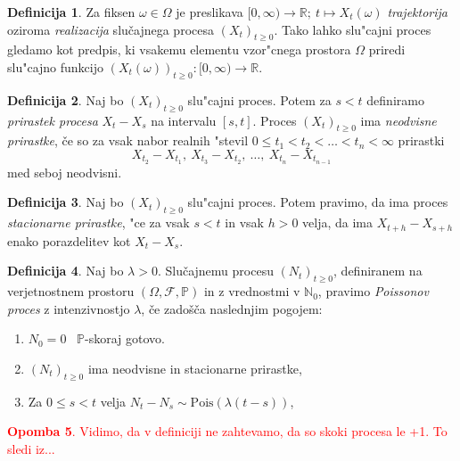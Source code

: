 \documentclass[12pt, a4paper, reqno]{amsart}
\theoremstyle{definition}
\newtheorem{definicija}{Definicija}[section]
\newtheorem{opomba}[definicija]{Opomba}
\theoremstyle{plain}
\newcommand{\N}{\mathbb{N}}
\newcommand{\Prob}{\mathbb{P}}
\newcommand{\1}{\mathds{1}}
\newcommand{\Pois}[1]{\text{Pois}(#1)}
\begin{document}
    \begin{definicija}
        Za fiksen $\omega \in \Omega$ je preslikava 
        $[0, \infty) \rightarrow \mathbb{R}; \ t \mapsto X_t(\omega)$ 
        \textit{trajektorija} oziroma \textit{realizacija} slučajnega procesa $(X_t)_{t\geq0}$.
        Tako lahko slu"cajni proces gledamo kot predpis, ki vsakemu elementu vzor"cnega prostora 
        $\Omega$ priredi slu"cajno funkcijo
        $(X_t(\omega))_{t\geq0}: [0, \infty) \rightarrow \mathbb{R}$.
        \label{def:realizac}
    \end{definicija}

    \begin{definicija}
        Naj bo $(X_t)_{t\geq0}$ slu"cajni proces. Potem za $s < t$ definiramo
        \textit{prirastek procesa} $X_t - X_s$ na intervalu $[s, t]$. Proces $(X_t)_{t\geq0}$ ima 
        \textit{neodvisne prirastke}, če so za vsak nabor realnih "stevil
        $0 \leq t_1 < t_2 < \ldots < t_n < \infty$ prirastki
        $$
            X_{t_2} - X_{t_1}, \ X_{t_3} - X_{t_2}, \ \ldots, \ X_{t_n} - X_{t_{n-1}}
        $$
        med seboj neodvisni.
        \label{def:prirastek}
    \end{definicija}

    \begin{definicija}
        Naj bo $(X_t)_{t\geq0}$ slu"cajni proces. Potem pravimo, da ima proces
        \textit{stacionarne prirastke}, "ce za vsak $s < t$ in vsak $h > 0$ velja, 
        da ima $X_{t+h} - X_{s+h}$ enako porazdelitev kot $X_t - X_s$.
        \label{def:stacPrir}
    \end{definicija}

    \begin{definicija}
        Naj bo $\lambda > 0$. Slučajnemu procesu $(N_t)_{t\geq 0}$, definiranem na verjetnostnem 
        prostoru $(\Omega, \mathcal{F}, \mathbb{P})$ in z vrednostmi v $\N_0$, pravimo 
        \textit{Poissonov proces} z intenzivnostjo $\lambda$, če zadošča naslednjim pogojem:
        \begin{enumerate}
            \item $N_0 = 0$ \ $\Prob$-skoraj gotovo.
            \item $(N_t)_{t\geq 0}$ ima neodvisne in stacionarne prirastke,
            \item Za $0 \leq s < t$ velja $ N_t - N_s \sim\Pois{\lambda(t - s)}$,
        \end{enumerate}
        \label{def:HPP}
    \end{definicija}
\textcolor{red}{
    \begin{opomba}
        Vidimo, da v definiciji ne zahtevamo, da so skoki procesa le +1. To sledi iz...
        \label{op:skoki}
    \end{opomba}
}
\end{document}

